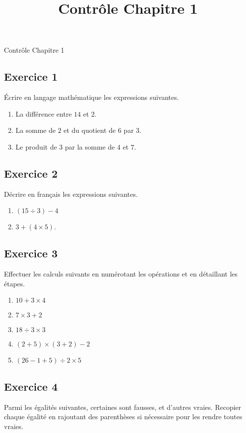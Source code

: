 \documentclass[14 pt]{extarticle}
\title{Contrôle Chapitre 1}
\date{}
\theoremstyle{plain}
\begin{document}
\begin{center}{\Large Contrôle Chapitre 1}\\ 
 \end{center}
 
 
 \subsection*{Exercice 1}
Écrire en langage mathématique les expressions suivantes.
\begin{enumerate}
\item La différence entre $14$ et $2$.
\item La somme de $2$ et du quotient de $6$ par $3$.
\item Le produit de $3$ par la somme de $4$ et $7$. 
\end{enumerate}

\subsection*{Exercice 2}

Décrire en français les expressions suivantes. 
\begin{enumerate}
\item $(15 \div 3) - 4$
\item $3 + (4\times 5)$.
\end{enumerate}

\subsection*{Exercice 3}

Effectuer les calculs suivants en numérotant les opérations et en détaillant les étapes. \begin{enumerate}
\item $10 + 3 \times 4$
\item $ 7 \times 3 + 2$
\item $18\div 3 \times 3$
\item $(2+5) \times (3+2) - 2$
\item $ (26 - 1 + 5)\div 2 \times 5$
\end{enumerate}

\subsection*{Exercice 4}

Parmi les égalités suivantes, certaines sont fausses, et d'autres vraies. Recopier chaque égalité en rajoutant des parenthèses si nécessaire pour les rendre toutes vraies.
\end{document}

